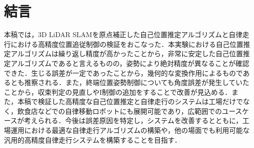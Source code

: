 \section{結言}
本稿では，3D LiDAR SLAMを原点補正した自己位置推定アルゴリズムと自律走行における高精度位置追従制御の検証をおこなった．本実験における自己位置推定アルゴリズムは繰り返し精度が高かったことから，非常に安定した自己位置推定アルゴリズムであると言えるものの，姿勢により絶対精度が異なることが確認できた．生じる誤差が一定であったことから，幾何的な変換作用によるものであるとも推察される．また，終端位置姿勢制御についても角度誤差が発生していたことから，収束判定の見直しやI制御の追加をすることで改善が見込める．また，本稿で検証した高精度な自己位置推定と自律走行のシステムは工場だけでなく，飲食店などでの自律移動ロボットにも展開可能であり，広範囲でのユースケースが考えられる．今後は誤差原因を特定し，システムを改善するとともに，工場運用における最適な自律走行アルゴリズムの構築や，他の場面でも利用可能な汎用的高精度自律走行システムを構築することを目指す．
